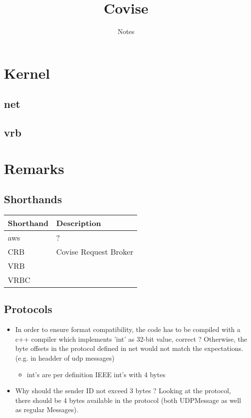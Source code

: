 \documentclass[12pt,pdftex,a4paper]{scrbook}
\newcommand{\shandentry}[2]{\label{intern::shorthands::#1} #1 & #2 \\ \hline}
\begin{document}
	\thispagestyle{empty}
	\title{Covise}
	\subtitle{Notes}
	\author{}
	\maketitle
	
	\newpage
	\tableofcontents

	\part{Kernel}
	
	\chapter{net}
	
	
	
	\chapter{vrb}

	

	\part{Remarks}

	\chapter{Shorthands}
	
	\begin{tabular}{||p{4cm}|p{10cm}||}
		\hline
		\textbf{Shorthand} & \textbf{Description}\\
		\hline
		\hline
		\shandentry{aws}{?}
		\shandentry{CRB}{Covise Request Broker}
		\shandentry{VRB}{}
		\shandentry{VRBC}{}
	\end{tabular}

	

	\chapter{Protocols}

	\begin{itemize}
		\item In order to ensure format compatibility, the code has to be compiled with a c++ compiler which implements 'int' as 32-bit value, correct ? Otherwise, the byte offsets in the protocol defined in net would not match the expectations. (e.g. in headder of udp messages)
		\begin{itemize}
			\item int's are per definition IEEE int's with 4 bytes
		\end{itemize}
		\item Why should the sender ID not exceed 3 bytes ? Looking at the protocol, there should be 4 bytes available in the protocol (both UDPMessage as well as regular Messages). 
	\end{itemize}
\end{document}
